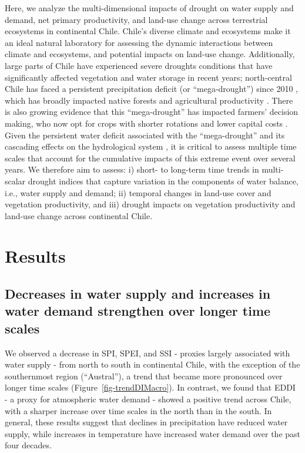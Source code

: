 \documentclass[
  sn-nature,
  numbered]{sn-jnl}
\begin{document}
Here, we analyze the multi-dimensional impacts of drought on water
supply and demand, net primary productivity, and land-use change across
terrestrial ecosystems in continental Chile. Chile's diverse climate and
ecosystems \citep{Beck2023, Luebert2022} make it an ideal natural
laboratory for assessing the dynamic interactions between climate and
ecosystems, and potential impacts on land-use change. Additionally,
large parts of Chile have experienced severe droughts conditions that
have significantly affected vegetation and water storage in recent
years; north-central Chile has faced a persistent precipitation deficit
(or ``mega-drought'') since 2010 \citep{Garreaud2017}, which has broadly
impacted native forests
\citep[e.g.,][]{Miranda2020, UrrutiaJalabert2018, Venegas2018} and
agricultural productivity
\citep[e.g.,][]{Zambrano2016, Zambrano2018, Zambrano2023}. There is also
growing evidence that this ``mega-drought'' has impacted farmers'
decision making, who now opt for crops with shorter rotations and lower
capital costs \citep{Zuniga2021}. Given the persistent water deficit
associated with the ``mega-drought'' and its cascading effects on the
hydrological system \citep{Boisier2018}, it is critical to assess
multiple time scales that account for the cumulative impacts of this
extreme event over several years. We therefore aim to assess: i) short-
to long-term time trends in multi-scalar drought indices that capture
variation in the components of water balance, i.e., water supply and
demand; ii) temporal changes in land-use cover and vegetation
productivity, and iii) drought impacts on vegetation productivity and
land-use change across continental Chile.

\section{Results}\label{results}

\subsection{Decreases in water supply and increases in water demand
strengthen over longer time
scales}\label{decreases-in-water-supply-and-increases-in-water-demand-strengthen-over-longer-time-scales}

We observed a decrease in SPI, SPEI, and SSI - proxies largely
associated with water supply - from north to south in continental Chile,
with the exception of the southernmost region (``Austral''), a trend
that became more pronounced over longer time scales
(Figure~\ref{fig-trendDIMacro}). In contrast, we found that EDDI - a
proxy for atmospheric water demand - showed a positive trend across
Chile, with a sharper increase over time scales in the north than in the
south. In general, these results suggest that declines in precipitation
have reduced water supply, while increases in temperature have increased
water demand over the past four decades.
\end{document}
